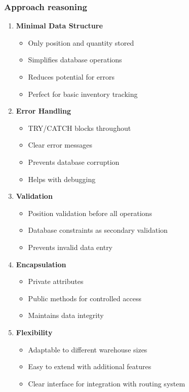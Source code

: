 \subsubsection{Approach reasoning}
\begin{enumerate}
\def\labelenumi{\arabic{enumi}.}
\tightlist
\item
  \textbf{Minimal Data Structure}

  \begin{itemize}
  \tightlist
  \item
    Only position and quantity stored
  \item
    Simplifies database operations
  \item
    Reduces potential for errors
  \item
    Perfect for basic inventory tracking
  \end{itemize}
\item
  \textbf{Error Handling}

  \begin{itemize}
  \tightlist
  \item
    TRY/CATCH blocks throughout
  \item
    Clear error messages
  \item
    Prevents database corruption
  \item
    Helps with debugging
  \end{itemize}
\item
  \textbf{Validation}

  \begin{itemize}
  \tightlist
  \item
    Position validation before all operations
  \item
    Database constraints as secondary validation
  \item
    Prevents invalid data entry
  \end{itemize}
\item
  \textbf{Encapsulation}

  \begin{itemize}
  \tightlist
  \item
    Private attributes
  \item
    Public methods for controlled access
  \item
    Maintains data integrity
  \end{itemize}
\item
  \textbf{Flexibility}

  \begin{itemize}
  \tightlist
  \item
    Adaptable to different warehouse sizes
  \item
    Easy to extend with additional features
  \item
    Clear interface for integration with routing system
  \end{itemize}
\end{enumerate}

